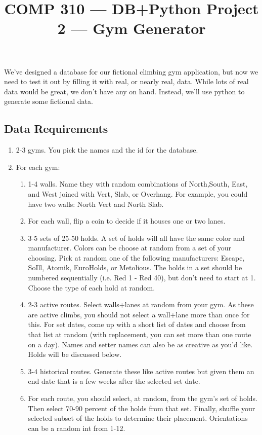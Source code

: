 \documentclass[nobib]{tufte-handout}
\title{COMP 310 --- DB+Python Project 2 --- Gym Generator}
\author{  }
\date{ }
\begin{document}
\maketitle  

We've designed a database for our fictional climbing gym application, but now we need to test it out by filling it with real, or nearly real, data. While lots of real data would be great, we don't have any on hand. Instead, we'll use python to generate some fictional data. 

\subsection*{Data Requirements}

\begin{enumerate}
    \item 2-3 gyms.  You pick the names and the id for the database. 
    \item For each gym:
    \begin{enumerate}
        \item 1-4 walls. Name they with random combinations of North,South, East, and West joined with Vert, Slab, or Overhang. For example, you could have two walls: North Vert and North Slab. 
        \item For each wall, flip a coin to decide if it houses one or two lanes. 
        \item 3-5 sets of 25-50 holds.  A set of holds will all have the same color and manufacturer. Colors can be choose at random from a set of your choosing. Pick at random one of the following manufacturers: Escape, SoIll, Atomik, EuroHolds, or Metolious. The holds in a set should be numbered sequentially (i.e. Red 1 - Red 40), but don't need to start at 1. Choose the type of each hold at random. 
        \item 2-3 active routes. Select walls+lanes at random from your gym. As these are active climbs, you should not select a wall+lane more than once for this. For set dates, come up with a short list of dates and choose from that list at random (with replacement, you can set more than one route on a day). Names and setter names can also be as creative as you'd like. Holds will be discussed below. 
        \item 3-4 historical routes. Generate these like active routes but given them an end date that is a few weeks after the selected set date. 
        \item For each route, you should select, at random, from the gym's set of holds. Then select 70-90 percent of the holds from that set. Finally, shuffle your selected subset of the holds to determine their placement. Orientations can be a random int from 1-12. 
    \end{enumerate}
\end{enumerate}
\end{document}
